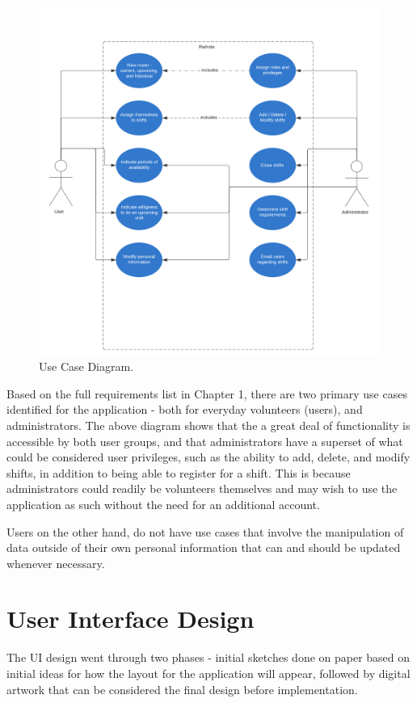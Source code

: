 \begin{figure}[h!]
    \includegraphics[width=\textwidth]{Figures/usecase}
    \caption{Use Case Diagram.}
    \label{fig:usecase}
\end{figure}

Based on the full requirements list in Chapter 1, there are two primary use cases identified for the application - both for everyday volunteers (users), and administrators. The above diagram shows that the a great deal of functionality is accessible by both user groups, and that administrators have a superset of what could be considered user privileges, such as the ability to add, delete, and modify shifts, in addition to being able to register for a shift. This is because administrators could readily be volunteers themselves and may wish to use the application as such without the need for an additional account.

Users on the other hand, do not have use cases that involve the manipulation of data outside of their own personal information that can and should be updated whenever necessary.

\section{User Interface Design}
The UI design went through two phases - initial sketches done on paper based on initial ideas for how the layout for the application will appear, followed by digital artwork that can be considered the final design before implementation.

